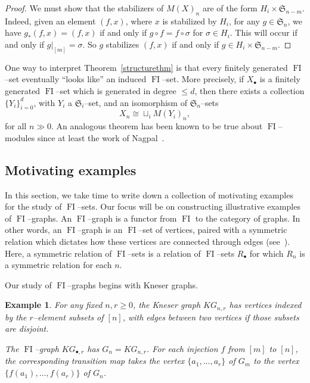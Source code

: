 \documentclass[10pt]{amsart}
\DeclareMathOperator{\FI}{FI}
\newcommand{\Sn}{\mathfrak{S}}
\newcommand{\dt}{\bullet}
\newtheorem{example}[theorem]{Example}
\theoremstyle{definition}
\begin{document}
\begin{proof} 
We must show that the stabilizers of $M(X)_n$ are of the form $H_i \times \Sn_{n-m}$. Indeed, given an element $(f,x)$, where $x$ is stabilized by $H_i$, for any $g \in \Sn_n$, we have $g_{\ast}(f,x) = (f,x)$ if and only if $g \circ f = f \circ \sigma$ for $\sigma \in H_i$.
This will occur if and only if $g|_{[m]} = \sigma$. So $g$ stabilizes $(f,x)$ if and only if $g \in H_i \times \Sn_{n-m}$.
\end{proof}

One way to interpret Theorem~\ref{structurethm} is that every finitely generated $\FI$--set eventually ``looks like'' an induced $\FI$--set. More precisely, if $X_\dt$ is a finitely generated $\FI$--set which is generated in degree $\leq d$, then there exists a collection $\{Y_i\}_{i=0}^d$, with $Y_i$ a $\Sn_i$--set, and an isomorphism of $\Sn_n$--sets
\[
X_n \cong \sqcup_i M(Y_i)_n,
\]
for all $n \gg 0$. An analogous theorem has been known to be true about $\FI$--modules since at least the work of Nagpal~\cite{N}.

\subsection{Motivating examples} \label{examples}

In this section, we take time to write down a collection of motivating examples for the study of $\FI$--sets. Our focus will be on constructing illustrative examples of $\FI$--graphs. An $\FI$--graph is a functor from $\FI$ to the category of graphs. In other words, an $\FI$--graph is an $\FI$--set of vertices, paired with a symmetric relation which dictates how these vertices are connected through edges (see~\cite{RW}). Here, a symmetric relation of $\FI$--sets is a relation of $\FI$--sets $R_\dt$ for which $R_n$ is a symmetric relation for each $n$.

Our study of $\FI$--graphs begins with Kneser graphs.

\begin{example}\label{ex:kneser}
For any fixed $n,r \geq 0$, the Kneser graph $KG_{n,r}$ has vertices indexed by the $r$--element subsets of $[n]$, with edges between two vertices if those subsets are disjoint. 

The $\FI$--graph $KG_{\dt,r}$ has $G_n = KG_{n,r}$. For each injection $f$ from $[m]$ to $[n]$, the corresponding transition map takes the vertex $\{a_1,\dots,a_r\}$ of $G_m$ to the vertex $\{f(a_1),\dots,f(a_r)\}$ of $G_n$.
\end{example}
\end{document}
